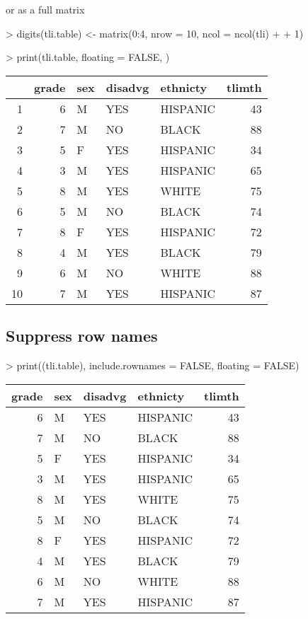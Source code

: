 \documentclass[letterpaper]{article}
\begin{document}
or as a full matrix
\begin{Schunk}
\begin{Sinput}
> digits(tli.table) <- matrix(0:4, nrow = 10, ncol = ncol(tli) + 
+     1)
\end{Sinput}
\end{Schunk}
\begin{Schunk}
\begin{Sinput}
> print(tli.table, floating = FALSE, )
\end{Sinput}
% latex table generated in R 2.6.0 by xtable 1.5-2 package
% Wed Oct 10 14:26:37 2007
\begin{tabular}{|rr|lp{3cm}l|r|}
  \hline
 & grade & sex & disadvg & ethnicty & tlimth \\
  \hline
1 & 6 & M & YES & HISPANIC & 43 \\
  2 &  7 & M & NO & BLACK & 88 \\
  3 &   5 & F & YES & HISPANIC &  34 \\
  4 &    3 & M & YES & HISPANIC &   65 \\
  5 &     8 & M & YES & WHITE &    75 \\
  6 & 5 & M & NO & BLACK & 74 \\
  7 &  8 & F & YES & HISPANIC & 72 \\
  8 &   4 & M & YES & BLACK &  79 \\
  9 &    6 & M & NO & WHITE &   88 \\
  10 &     7 & M & YES & HISPANIC &    87 \\
   \hline
\end{tabular}\end{Schunk}

\subsection{Suppress row names}
\begin{Schunk}
\begin{Sinput}
> print((tli.table), include.rownames = FALSE, floating = FALSE)
\end{Sinput}
% latex table generated in R 2.6.0 by xtable 1.5-2 package
% Wed Oct 10 14:26:37 2007
\begin{tabular}{r|lp{3cm}l|r|}
  \hline
grade & sex & disadvg & ethnicty & tlimth \\
  \hline
6 & M & YES & HISPANIC & 43 \\
   7 & M & NO & BLACK & 88 \\
    5 & F & YES & HISPANIC &  34 \\
     3 & M & YES & HISPANIC &   65 \\
      8 & M & YES & WHITE &    75 \\
  5 & M & NO & BLACK & 74 \\
   8 & F & YES & HISPANIC & 72 \\
    4 & M & YES & BLACK &  79 \\
     6 & M & NO & WHITE &   88 \\
      7 & M & YES & HISPANIC &    87 \\
   \hline
\end{tabular}\end{Schunk}
\end{document}
